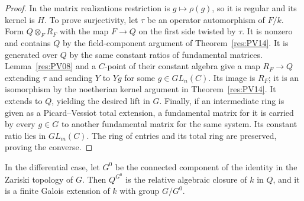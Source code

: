 \begin{proof}
In the matrix realizations restriction is \(g\mapsto\rho(g)\),
so it is regular and its kernel is \(H\).
To prove surjectivity, let \(\tau\) be an operator
automorphism of \(F/k\). Form \(Q\otimes_F R_F\) with the
map \(F\to Q\) on the first side twisted by \(\tau\).
It is nonzero and contains \(Q\) by the field-component
argument of Theorem~\ref{res:PV14}. It is generated over
\(Q\) by the same constant ratios of fundamental matrices.
Lemma~\ref{res:PV08} and a \(C\)-point of their constant
algebra give a map \(R_F\to Q\) extending \(\tau\) and sending
\(Y\) to \(Yg\) for some \(g\in GL_n(C)\). Its image is
\(R_F\); it is an isomorphism by the noetherian kernel argument
in Theorem~\ref{res:PV14}. It extends to \(Q\), yielding
the desired lift in \(G\). Finally, if an intermediate ring is
given as a Picard--Vessiot total extension, a fundamental
matrix for it is carried by every \(g\in G\) to another
fundamental matrix for the same system. Its constant ratio
lies in \(GL_m(C)\). The ring of entries and its total ring
are preserved, proving the converse.
\end{proof}

\begin{corollary}
\label{res:PV20}
In the differential case, let \(G^0\) be the connected component
of the identity in the Zariski topology of \(G\). Then \(Q^{G^0}\)
is the relative algebraic closure of \(k\) in \(Q\),
and it is a finite Galois extension of \(k\) with group \(G/G^0\).
\end{corollary}

